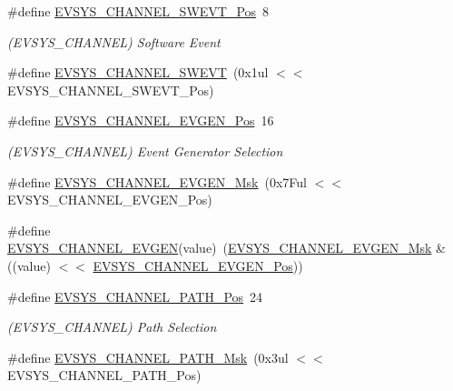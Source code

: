\begin{DoxyCompactItemize}
\item 
\#define \mbox{\hyperlink{group___s_a_m_d21___e_v_s_y_s_ga9b5694abb0b825de297fc65a55e81008}{E\+V\+S\+Y\+S\+\_\+\+C\+H\+A\+N\+N\+E\+L\+\_\+\+S\+W\+E\+V\+T\+\_\+\+Pos}}~8
\begin{DoxyCompactList}\small\item\em (E\+V\+S\+Y\+S\+\_\+\+C\+H\+A\+N\+N\+EL) Software Event \end{DoxyCompactList}\item 
\#define \mbox{\hyperlink{group___s_a_m_d21___e_v_s_y_s_ga9f835e0f80c4efa2ab37c1a66f367708}{E\+V\+S\+Y\+S\+\_\+\+C\+H\+A\+N\+N\+E\+L\+\_\+\+S\+W\+E\+VT}}~(0x1ul $<$$<$ E\+V\+S\+Y\+S\+\_\+\+C\+H\+A\+N\+N\+E\+L\+\_\+\+S\+W\+E\+V\+T\+\_\+\+Pos)
\item 
\#define \mbox{\hyperlink{group___s_a_m_d21___e_v_s_y_s_ga49da646ddac2acf9b067c8299b5f6335}{E\+V\+S\+Y\+S\+\_\+\+C\+H\+A\+N\+N\+E\+L\+\_\+\+E\+V\+G\+E\+N\+\_\+\+Pos}}~16
\begin{DoxyCompactList}\small\item\em (E\+V\+S\+Y\+S\+\_\+\+C\+H\+A\+N\+N\+EL) Event Generator Selection \end{DoxyCompactList}\item 
\#define \mbox{\hyperlink{group___s_a_m_d21___e_v_s_y_s_gafb9b70ff5a602f5a8ac9a5e2ee5ffe19}{E\+V\+S\+Y\+S\+\_\+\+C\+H\+A\+N\+N\+E\+L\+\_\+\+E\+V\+G\+E\+N\+\_\+\+Msk}}~(0x7\+Ful $<$$<$ E\+V\+S\+Y\+S\+\_\+\+C\+H\+A\+N\+N\+E\+L\+\_\+\+E\+V\+G\+E\+N\+\_\+\+Pos)
\item 
\#define \mbox{\hyperlink{group___s_a_m_d21___e_v_s_y_s_gafb88af9747846db450470c6bbab09664}{E\+V\+S\+Y\+S\+\_\+\+C\+H\+A\+N\+N\+E\+L\+\_\+\+E\+V\+G\+EN}}(value)~(\mbox{\hyperlink{group___s_a_m_d21___e_v_s_y_s_gafb9b70ff5a602f5a8ac9a5e2ee5ffe19}{E\+V\+S\+Y\+S\+\_\+\+C\+H\+A\+N\+N\+E\+L\+\_\+\+E\+V\+G\+E\+N\+\_\+\+Msk}} \& ((value) $<$$<$ \mbox{\hyperlink{group___s_a_m_d21___e_v_s_y_s_ga49da646ddac2acf9b067c8299b5f6335}{E\+V\+S\+Y\+S\+\_\+\+C\+H\+A\+N\+N\+E\+L\+\_\+\+E\+V\+G\+E\+N\+\_\+\+Pos}}))
\item 
\#define \mbox{\hyperlink{group___s_a_m_d21___e_v_s_y_s_ga1c99b6755155dc2b405c63587973570b}{E\+V\+S\+Y\+S\+\_\+\+C\+H\+A\+N\+N\+E\+L\+\_\+\+P\+A\+T\+H\+\_\+\+Pos}}~24
\begin{DoxyCompactList}\small\item\em (E\+V\+S\+Y\+S\+\_\+\+C\+H\+A\+N\+N\+EL) Path Selection \end{DoxyCompactList}\item 
\#define \mbox{\hyperlink{group___s_a_m_d21___e_v_s_y_s_ga8b3ef7a0b4006e53d02e028a7357290d}{E\+V\+S\+Y\+S\+\_\+\+C\+H\+A\+N\+N\+E\+L\+\_\+\+P\+A\+T\+H\+\_\+\+Msk}}~(0x3ul $<$$<$ E\+V\+S\+Y\+S\+\_\+\+C\+H\+A\+N\+N\+E\+L\+\_\+\+P\+A\+T\+H\+\_\+\+Pos)

\end{DoxyCompactItemize}
